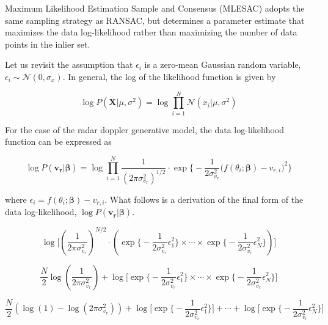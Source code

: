 \documentclass[]{article}
\begin{document}
Maximum Likelihood Estimation Sample and Consensus (MLESAC) \cite{MLESAC} adopts the same sampling strategy as RANSAC, but determines a parameter estimate that maximizes the data log-likelihood rather than maximizing the number of data points in the inlier set.

Let us revisit the assumption that $\epsilon_i$ is a zero-mean Gaussian random variable, $\epsilon_i \sim \mathcal{N}(0,\sigma_x)$. In general, the log of the likelihood function is given by

\begin{equation}
	\log P(\mathbf{X} \vert \mu, \sigma^2) = \log \prod_{i=1}^N \mathcal{N}(x_i \vert \mu, \sigma^2)	
\end{equation}

For the case of the radar doppler generative model, the data log-likelihood function can be expressed as

\begin{equation}
	\log P(\mathbf{v_r} \vert \boldsymbol{\beta}) = \log \prod_{i=1}^N \frac{1}{(2\pi\sigma_{v_r}^2)^{1/2}} \cdot \exp \bigg\lbrace -\frac{1}{2\sigma_{v_r}^2} \big( f(\theta_i;\boldsymbol{\beta}) - v_{r,i} \big)^2 \bigg\rbrace
\end{equation}

where $\epsilon_i = f(\theta_i;\boldsymbol{\beta}) - v_{r,i}$. What follows is a derivation of the final form of the data log-likelihood, $\log P(\mathbf{v_r} \vert \boldsymbol{\beta})$.

\begin{equation}
	\log \bigg\lbrack \left( \frac{1}{2\pi\sigma_{v_r}^2} \right)^{N/2} \cdot \left( \exp \bigg\lbrace -\frac{1}{2\sigma_{v_r}^2} \epsilon_1^2 \bigg\rbrace \times \cdots \times \exp \bigg\lbrace -\frac{1}{2\sigma_{v_r}^2} \epsilon_N^2 \bigg\rbrace  \right) \bigg\rbrack
\end{equation}

\begin{equation}
	\frac{N}{2} \log \left( \frac{1}{2\pi\sigma_{v_r}^2} \right) + \log \bigg\lbrack \exp \bigg\lbrace -\frac{1}{2\sigma_{v_r}^2} \epsilon_1^2 \bigg\rbrace \times \cdots \times \exp \bigg\lbrace -\frac{1}{2\sigma_{v_r}^2} \epsilon_N^2 \bigg\rbrace \bigg\rbrack
\end{equation}

\begin{equation}
	\frac{N}{2} \left( \log(1) - \log (2\pi\sigma_{v_r}^2) \right) + \log \bigg\lbrack \exp \bigg\lbrace -\frac{1}{2\sigma_{v_r}^2} \epsilon_1^2 \bigg\rbrace \bigg\rbrack + \cdots + \log \bigg\lbrack \exp \bigg\lbrace -\frac{1}{2\sigma_{v_r}^2} \epsilon_N^2 \bigg\rbrace \bigg\rbrack
\end{equation}
\end{document}
